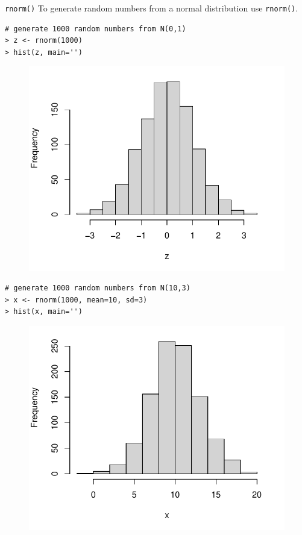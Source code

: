 \documentclass[10pt]{beamer}
\begin{document}
\begin{frame}[fragile]{\texttt{rnorm()}}
To generate random numbers from a normal distribution use \texttt{rnorm()}.

\begin{verbatim}
# generate 1000 random numbers from N(0,1)
> z <- rnorm(1000)
> hist(z, main='')
\end{verbatim}

\begin{figure}[htbp]
\centering
\includegraphics[scale=0.45]{figure/hist_znorm.pdf}
\end{figure}
\end{frame}

\begin{frame}[fragile]{}
\begin{verbatim}
# generate 1000 random numbers from N(10,3)
> x <- rnorm(1000, mean=10, sd=3)
> hist(x, main='')
\end{verbatim}

\begin{figure}[htbp]
\centering
\includegraphics[scale=0.45]{figure/hist_norm1.pdf}
\end{figure}
\end{frame}
\end{document}
